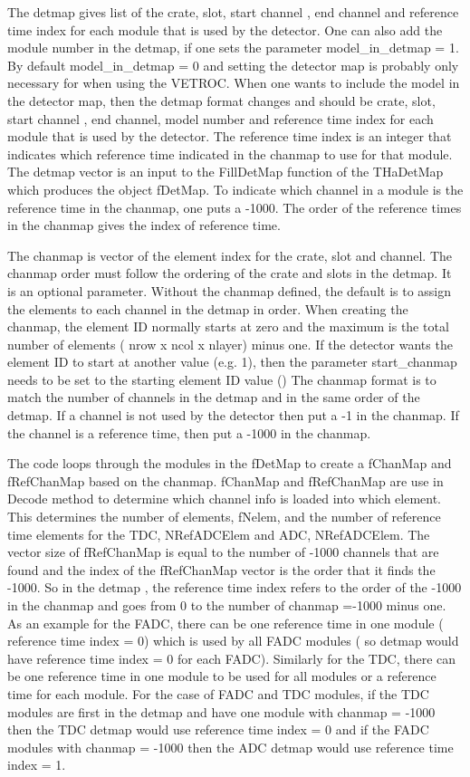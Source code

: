 \documentclass[11pt]{article}
\begin{document}
The detmap gives list of the crate, slot, start channel , end channel and reference time index
for each module that is used by the detector.
One can also add the module number in the detmap, if one sets 
the parameter model\_in\_detmap = 1. By default model\_in\_detmap = 0 and setting the
detector map is probably only necessary for when using the VETROC.
When one wants to include the model in the detector map, then the detmap format changes
and should be crate, slot, start channel , end channel, model number and reference time index
for each module that is used by the detector.
The reference time index is an integer that indicates which reference time indicated in the chanmap to use
for that module.
The detmap vector is an input to the FillDetMap function of the THaDetMap which produces the object fDetMap.
To indicate which channel in a module is the reference time in the chanmap, one puts a -1000. The order of the
reference times in the chanmap gives the index of reference time.


The chanmap is vector of the element index for the crate, slot and channel. The chanmap
order must follow the ordering of the crate and slots in the detmap.
It is an optional parameter. Without the chanmap defined, the default is to assign the
elements to each channel in the detmap in order.
When creating the chanmap, the element ID normally starts at zero 
and the maximum is the total number of elements ( nrow x ncol x nlayer)
minus one. If the detector wants the element ID to start at another value (e.g. 1), then the parameter
start\_chanmap needs to be set to the starting element ID value ()  The chanmap format is to match the number of channels in the detmap and
in the same order of the detmap. If a channel is not used by the detector then put a -1
in the chanmap. If the channel is a reference time, then put a -1000 in the chanmap.

The code loops through the modules in the fDetMap to create a fChanMap and fRefChanMap based on the chanmap.
 fChanMap and fRefChanMap are use in Decode method to determine which channel info is loaded into which element.
 This determines the number of elements, fNelem, and the number of reference time elements for the TDC,
 NRefADCElem and ADC, NRefADCElem.
The vector size of fRefChanMap is equal to the number of -1000 channels that are found and the index of the
fRefChanMap vector is the order that it finds the -1000. So in the detmap , the reference time index refers
to the order of the -1000 in the chanmap and goes from 0 to the number of chanmap =-1000 minus one.
As an example for the FADC, there can be one reference time in one module ( reference time index = 0)
which is used by all FADC modules ( so detmap would have reference time index = 0 for each FADC).
Similarly for the TDC, there can be one reference time in one module to be used for all modules
or a reference time for each module. For the case of FADC and TDC modules, if the TDC modules
are first in the detmap and have one module with  chanmap = -1000 then the TDC detmap would 
use reference time index = 0 and if the FADC modules with  chanmap = -1000 then the ADC detmap
would use reference time index = 1. 
 
\end{document}
